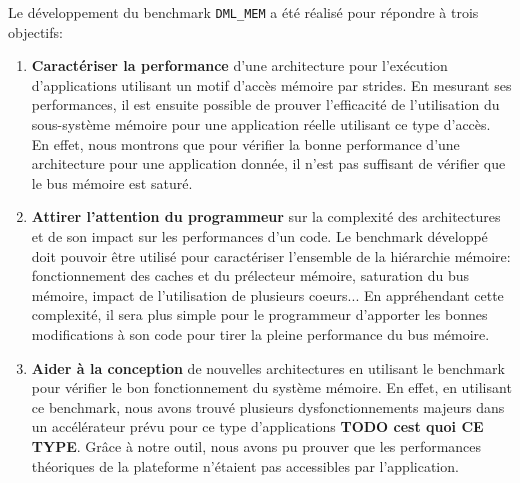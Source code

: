         Le développement du benchmark \verb=DML_MEM= a été réalisé pour répondre à trois objectifs:
        \begin{enumerate}
            \item \textbf{Caractériser la performance} d'une architecture pour l'exécution d'applications utilisant un motif d'accès mémoire par strides. En mesurant ses performances, il est ensuite possible de prouver l’efficacité de l’utilisation du sous-système mémoire pour une application réelle utilisant ce type d'accès. En effet, nous montrons que pour vérifier la bonne performance d'une architecture pour une application donnée, il n'est pas suffisant de vérifier que le bus mémoire est saturé.
            \item \textbf{Attirer l'attention du programmeur} sur la complexité des architectures et de son impact sur les performances d'un code. Le benchmark développé doit pouvoir être utilisé pour caractériser l'ensemble de la hiérarchie mémoire: fonctionnement des caches et du prélecteur mémoire, saturation du bus mémoire, impact de l'utilisation de plusieurs coeurs... En appréhendant cette complexité, il sera plus simple pour le programmeur d'apporter les bonnes modifications à son code pour tirer la pleine performance du bus mémoire.
            \item \textbf{Aider à la conception} de nouvelles architectures en utilisant le benchmark pour vérifier le bon fonctionnement du système mémoire. En effet, en utilisant ce benchmark, nous avons trouvé plusieurs dysfonctionnements majeurs dans un accélérateur prévu pour ce type d'applications \textbf{TODO cest quoi CE TYPE}. Grâce à notre outil, nous avons pu prouver que les performances théoriques de la plateforme n'étaient pas accessibles par l'application. 
        \end{enumerate}

    
